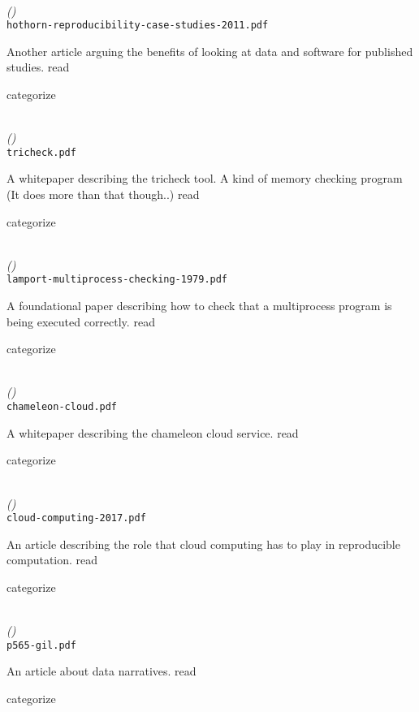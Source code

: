\documentclass{article}
\newcommand{\Read}{
	\gls{read}
}
\newcommand{\categorize}{
	\gls{categorize}
}
\newenvironment{refdef}[2] {
	\noindent \textbf{\citetitle{#1}} \cite{#1}\\ \citejournalorbooktitle{#1} \textit{(\citeyear{#1})}\\ \texttt{#2} \vspace{0.2in} \par 
} {
\vspace{0.2in}
}
\begin{document}
\begin{refdef}{hothorn-reproducibility-case-studies-2011}{hothorn-reproducibility-case-studies-2011.pdf}
Another article arguing the benefits of looking at data and software for published studies. \Read \categorize
\end{refdef}

\begin{refdef}{tricheck}{tricheck.pdf}
A whitepaper describing the tricheck tool. A kind of memory checking program (It does more than that though..) \Read \categorize
\end{refdef}

\begin{refdef}{lamport-multiprocess-checking-1979}{lamport-multiprocess-checking-1979.pdf}
A foundational paper describing how to check that a multiprocess program is being executed correctly. \Read \categorize
\end{refdef}

\begin{refdef}{chameleon-cloud}{chameleon-cloud.pdf}
A whitepaper describing the chameleon cloud service. \Read \categorize
\end{refdef}

\begin{refdef}{deOliveira2017}{cloud-computing-2017.pdf}
An article describing the role that cloud computing has to play in reproducible computation. \Read \categorize
\end{refdef}

\begin{refdef}{gil-data-narratives-2017}{p565-gil.pdf}
An article about data narratives. \Read \categorize
\end{refdef}

%
%
\printbibliography[heading=bibintoc]

\printindex

\printglossaries
\end{document}
